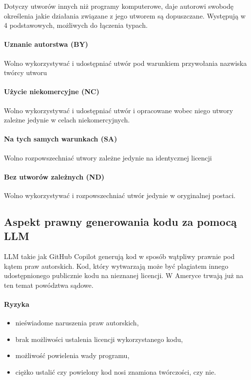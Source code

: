 \documentclass{article}
\begin{document}
Dotyczy utworów innych niż programy komputerowe, daje autorowi swobodę określenia jakie działania związane z jego utworem są dopuszczane. Występują w 4 podstawowych, możliwych do łączenia typach.

\paragraph{Uznanie autorstwa (BY)}

Wolno wykorzystywać i udostępniać utwór pod warunkiem przywołania nazwiska twórcy utworu

\paragraph{Użycie niekomercyjne (NC)}

Wolno wykorzystywać i udostępniać utwór i opracowane wobec niego utwory zależne jedynie w celach niekomercyjnych.

\paragraph{Na tych samych warunkach (SA)}

Wolno rozpowszechniać utwory zależne jedynie na identycznej licencji

\paragraph{Bez utworów zależnych (ND)}

Wolno wykorzystywać i rozpowszechniać utwór jedynie w oryginalnej postaci.

\subsection{Aspekt prawny generowania kodu za pomocą LLM}

LLM takie jak GitHub Copilot generują kod w sposób wątpliwy prawnie pod kątem praw autorskich. Kod, który wytwarzają może być plagiatem innego udostępnionego publicznie kodu na nieznanej licencji. W Ameryce trwają już na ten temat powództwa sądowe.

\paragraph{Ryzyka}

\begin{itemize}
  \item nieświadome naruszenia praw autorskich,
  \item brak możliwości ustalenia licencji wykorzystanego kodu,
  \item możliwość powielenia wady programu,
  \item ciężko ustalić czy powielony kod nosi znamiona twórczości, czy nie.
\end{itemize}
\end{document}
